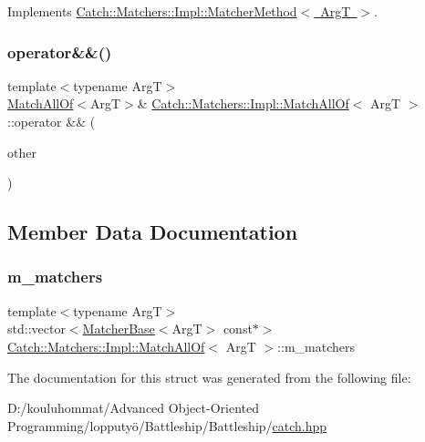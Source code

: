 Implements \mbox{\hyperlink{struct_catch_1_1_matchers_1_1_impl_1_1_matcher_method_ae0920ff9e817acf08e1bb0cbcb044e30}{Catch\+::\+Matchers\+::\+Impl\+::\+Matcher\+Method$<$ Arg\+T $>$}}.

\mbox{\label{struct_catch_1_1_matchers_1_1_impl_1_1_match_all_of_a9d0e38b36474336498d627610db434f3}} 
\subsubsection{\texorpdfstring{operator\&\&()}{operator\&\&()}}
{\footnotesize\ttfamily template$<$typename ArgT$>$ \\
\mbox{\hyperlink{struct_catch_1_1_matchers_1_1_impl_1_1_match_all_of}{Match\+All\+Of}}$<$ArgT$>$\& \mbox{\hyperlink{struct_catch_1_1_matchers_1_1_impl_1_1_match_all_of}{Catch\+::\+Matchers\+::\+Impl\+::\+Match\+All\+Of}}$<$ ArgT $>$\+::operator \&\& (\begin{DoxyParamCaption}\item[{\mbox{\hyperlink{struct_catch_1_1_matchers_1_1_impl_1_1_matcher_base}{Matcher\+Base}}$<$ ArgT $>$ const \&}]{other }\end{DoxyParamCaption})\hspace{0.3cm}{\ttfamily [inline]}}



\subsection{Member Data Documentation}
\mbox{\label{struct_catch_1_1_matchers_1_1_impl_1_1_match_all_of_a98d6a2611f195a4a5c49f92fd877be9a}} 
\subsubsection{\texorpdfstring{m\+\_\+matchers}{m\_matchers}}
{\footnotesize\ttfamily template$<$typename ArgT$>$ \\
std\+::vector$<$\mbox{\hyperlink{struct_catch_1_1_matchers_1_1_impl_1_1_matcher_base}{Matcher\+Base}}$<$ArgT$>$ const$\ast$$>$ \mbox{\hyperlink{struct_catch_1_1_matchers_1_1_impl_1_1_match_all_of}{Catch\+::\+Matchers\+::\+Impl\+::\+Match\+All\+Of}}$<$ ArgT $>$\+::m\+\_\+matchers}



The documentation for this struct was generated from the following file\+:\begin{DoxyCompactItemize}
\item 
D\+:/kouluhommat/\+Advanced Object-\/\+Oriented Programming/lopputyö/\+Battleship/\+Battleship/\mbox{\hyperlink{catch_8hpp}{catch.\+hpp}}\end{DoxyCompactItemize}

